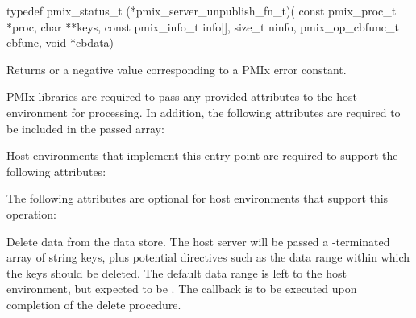 \format

\cspecificstart
\begin{codepar}
typedef pmix_status_t (*pmix_server_unpublish_fn_t)(
                             const pmix_proc_t *proc,
                             char **keys,
                             const pmix_info_t info[],
                             size_t ninfo,
                             pmix_op_cbfunc_t cbfunc,
                             void *cbdata)
\end{codepar}
\cspecificend

\begin{arglist}
\end{arglist}

Returns  or a negative value corresponding to a PMIx error constant.

\reqattrstart
\ac{PMIx} libraries are required to pass any provided attributes to the host environment for processing. In addition, the following attributes are required to be included in the passed  array:


Host environments that implement this entry point are required to support the following attributes:


\reqattrend

\optattrstart
The following attributes are optional for host environments that support this operation:


\optattrend

\descr

Delete data from the data store.
The host server will be passed a -terminated array of string keys, plus potential directives such as the data range within which the keys should be deleted. The default data range is left to the host environment, but expected to be .
The callback is to be executed upon completion of the delete procedure.

